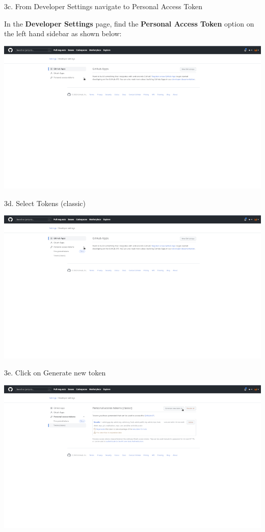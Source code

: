 \documentclass[
  12pt,
]{book}
\begin{document}
3c. From Developer Settings navigate to Personal Access Token

In the \textbf{Developer Settings} page, find the \textbf{Personal Access Token} option on the left hand sidebar as shown below:

\includegraphics{images/github_pat4.png}

3d. Select Tokens (classic)

\includegraphics{images/github_pat5.png}

3e. Click on Generate new token

\includegraphics{images/github_pat7.png}
\end{document}
